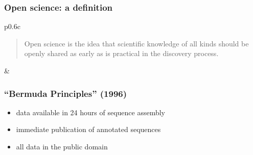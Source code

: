 \documentclass{beamer}
\begin{document}
\begin{frame}\frametitle{Open science: a definition}
\centering
\begin{tabular}{p{0.6\textwidth}c}
	\begin{minipage}{\linewidth}
	\begin{quote}
		\begin{fancyquote}
		Open science is the idea that scientific knowledge of all kinds
		should be openly shared as early as is practical in the discovery
		process.
		\end{fancyquote}
	\end{quote}
	\end{minipage}
	&
\end{tabular}
\end{frame}

\begin{frame}\frametitle{``Bermuda Principles'' (1996)}
	\begin{itemize}
		\item data available in 24 hours of sequence assembly
		\item immediate publication of annotated sequences
		\item all data in the public domain
	\end{itemize}
\end{frame}
\end{document}
